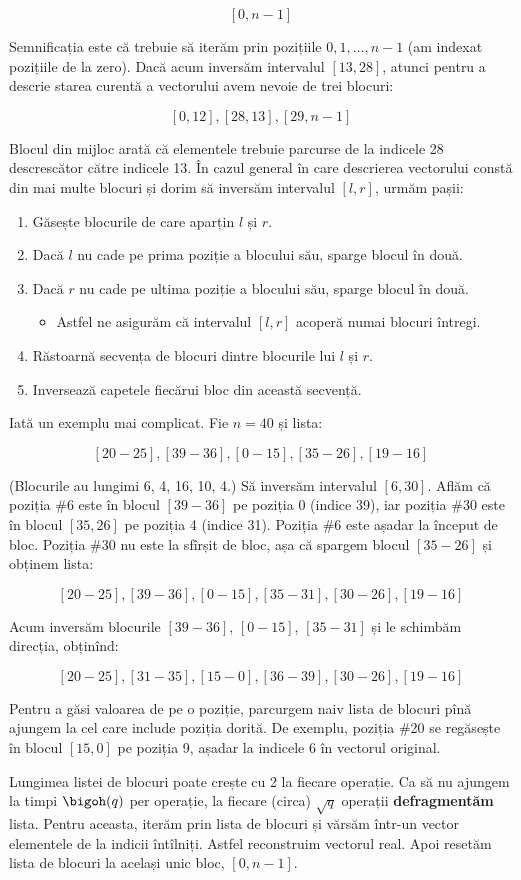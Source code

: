 $$[0,n-1]$$

Semnificația este că trebuie să iterăm prin pozițiile $0, 1, \dots, n-1$ (am indexat pozițiile de la zero). Dacă acum inversăm intervalul $[13, 28]$, atunci pentru a descrie starea curentă a vectorului avem nevoie de trei blocuri:

$$[0,12], [28, 13], [29, n-1]$$

Blocul din mijloc arată că elementele trebuie parcurse de la indicele 28 descrescător către indicele 13. În cazul general în care descrierea vectorului constă din mai multe blocuri și dorim să inversăm intervalul $[l, r]$, urmăm pașii:

\begin{enumerate}
  \item Găsește blocurile de care aparțin $l$ și $r$.

  \item Dacă $l$ nu cade pe prima poziție a blocului său, sparge blocul în două.

  \item Dacă $r$ nu cade pe ultima poziție a blocului său, sparge blocul în două.

  \begin{itemize}
    \item Astfel ne asigurăm că intervalul $[l,r]$ acoperă numai blocuri întregi.
  \end{itemize}

  \item Răstoarnă secvența de blocuri dintre blocurile lui $l$ și $r$.

  \item Inversează capetele fiecărui bloc din această secvență.
\end{enumerate}

Iată un exemplu mai complicat. Fie $n = 40$ și lista:

$$[20-25], [39-36], [0-15], [35-26], [19-16]$$

(Blocurile au lungimi 6, 4, 16, 10, 4.) Să inversăm intervalul $[6,30]$. Aflăm că poziția \#6 este în blocul $[39-36]$ pe poziția 0 (indice 39), iar poziția \#30 este în blocul $[35,26]$ pe poziția 4 (indice 31). Poziția \#6 este așadar la început de bloc. Poziția \#30 nu este la sfîrșit de bloc, așa că spargem blocul $[35-26]$ și obținem lista:

$$[20-25], [39-36], [0-15], [35-31], [30-26], [19-16]$$

Acum inversăm blocurile $[39-36]$, $[0-15]$, $[35-31]$ și le schimbăm direcția, obținînd:

$$[20-25], [31-35], [15-0], [36-39], [30-26], [19-16]$$

Pentru a găsi valoarea de pe o poziție, parcurgem naiv lista de blocuri pînă ajungem la cel care include poziția dorită. De exemplu, poziția \#20 se regăsește în blocul $[15,0]$ pe poziția 9, așadar la indicele 6 în vectorul original.

Lungimea listei de blocuri poate crește cu 2 la fiecare operație. Ca să nu ajungem la timpi $\bigoh(q)$ per operație, la fiecare (circa) $\sqrt{q}$ operații \textbf{defragmentăm} lista. Pentru aceasta, iterăm prin lista de blocuri și vărsăm într-un vector elementele de la indicii întîlniți. Astfel reconstruim vectorul real. Apoi resetăm lista de blocuri la același unic bloc, $[0,n-1]$.
